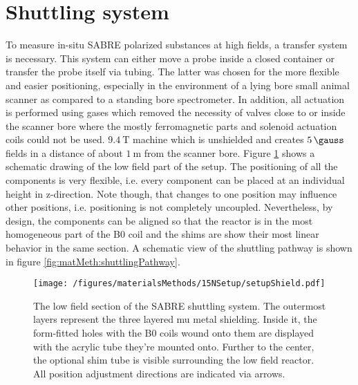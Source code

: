     \section{Shuttling system}
    \label{sec:shuttlingSystem}
    To measure in-situ SABRE polarized substances at high fields, a transfer system is necessary. This system can either move a probe inside a closed container \cite{kiryutin_fast_2016-1} or transfer the probe itself via tubing. The latter was chosen for the more flexible and easier positioning, especially in the environment of a lying bore small animal scanner as compared to a standing bore spectrometer. In addition, all actuation is performed using gases which removed the necessity of valves close to or inside the scanner bore where the mostly ferromagnetic parts and solenoid actuation coils could not be used.
    $\SI{9.4}{\tesla}$ machine which is unshielded and creates $\SI{5}{\gauss}$ fields in a distance of about $\SI{1}{\meter}$ from the scanner bore.
    Figure \ref{fig:matMeth:shields15N} shows a schematic drawing of the low field part of the setup. The positioning of all the components is very flexible, i.e. every component can be placed at an individual height in z-direction. Note though, that changes to one position may influence other positions, i.e. positioning is not completely uncoupled. Nevertheless, by design, the components can be aligned so that the reactor is in the most homogeneous part of the B0 coil and the shims are show their most linear behavior in the same section. A schematic view of the shuttling pathway is shown in figure \ref{fig:matMeth:shuttlingPathway}.
        \begin{figure}
            \texttt{[image: /figures/materialsMethods/15NSetup/setupShield.pdf]}
            \caption[Shuttling system shields]{The low field section of the SABRE shuttling system. The outermost layers represent the three layered mu metal shielding. Inside it, the form-fitted holes with the B0 coils wound onto them are displayed with the acrylic tube they're mounted onto. Further to the center, the optional shim tube is visible surrounding the low field reactor. All position adjustment directions are indicated via arrows.}
            \label{fig:matMeth:shields15N}
        \end{figure}

